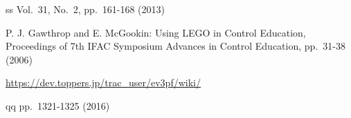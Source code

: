 \small
\begin{thebibliography}{99}
	\setlength{\itemsep}{0pt}
	\smallskip
	
	ss
	Vol.~31, No.~2, pp.~161-168 (2013)
	
	P. J. Gawthrop and E. McGookin: 
	Using LEGO in Control Education, 
	Proceedings of 7th IFAC Symposium Advances in Control Education, pp.~31-38 (2006)
	
	\url{https://dev.toppers.jp/trac_user/ev3pf/wiki/}
	
	qq
	pp.~1321-1325 (2016)
\end{thebibliography}
\normalsize